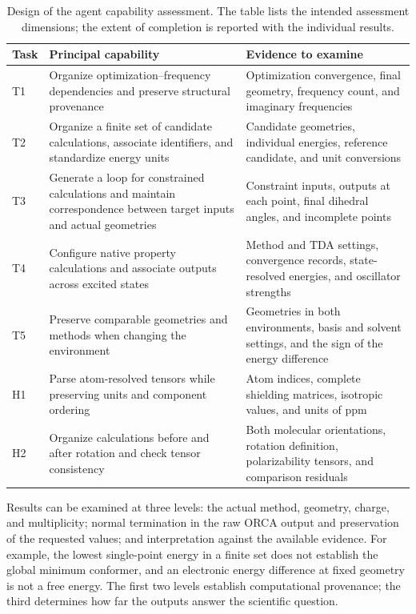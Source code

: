\documentclass[a4paper,11pt]{article}
\begin{document}
\begin{table}[htbp]
  \centering\small
  \caption{Design of the agent capability assessment.
  The table lists the intended assessment dimensions; the extent of completion is reported with the individual results.}
  \label{tab:agent-capability-design}
  \begin{tabularx}{\linewidth}{lYY}
    \toprule
    Task & Principal capability & Evidence to examine\\
    \midrule
    T1 & Organize optimization--frequency dependencies and preserve structural provenance
       & Optimization convergence, final geometry, frequency count, and imaginary frequencies\\
    T2 & Organize a finite set of candidate calculations, associate identifiers, and standardize energy units
       & Candidate geometries, individual energies, reference candidate, and unit conversions\\
    T3 & Generate a loop for constrained calculations and maintain correspondence between target inputs and actual geometries
       & Constraint inputs, outputs at each point, final dihedral angles, and incomplete points\\
    T4 & Configure native property calculations and associate outputs across excited states
       & Method and TDA settings, convergence records, state-resolved energies, and oscillator strengths\\
    T5 & Preserve comparable geometries and methods when changing the environment
       & Geometries in both environments, basis and solvent settings, and the sign of the energy difference\\
    H1 & Parse atom-resolved tensors while preserving units and component ordering
       & Atom indices, complete shielding matrices, isotropic values, and units of ppm\\
    H2 & Organize calculations before and after rotation and check tensor consistency
       & Both molecular orientations, rotation definition, polarizability tensors, and comparison residuals\\
    \bottomrule
  \end{tabularx}
\end{table}

\FloatBarrier

Results can be examined at three levels: the actual method, geometry, charge, and multiplicity;
normal termination in the raw ORCA output and preservation of the requested values;
and interpretation against the available evidence.
For example, the lowest single-point energy in a finite set does not establish the global minimum conformer,
and an electronic energy difference at fixed geometry is not a free energy.
The first two levels establish computational provenance; the third determines how far the outputs answer the scientific question.
\end{document}
